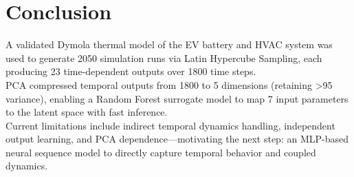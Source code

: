 \chapter{Conclusion}
A validated Dymola thermal model of the EV battery and HVAC system was used to generate 2050 simulation runs via Latin Hypercube Sampling, each producing 23 time-dependent outputs over 1800 time steps.\\
PCA compressed temporal outputs from 1800 to 5 dimensions (retaining >95 variance), enabling a Random Forest surrogate model to map 7 input parameters to the latent space with fast inference.\\
Current limitations include indirect temporal dynamics handling, independent output learning, and PCA dependence—motivating the next step: an MLP-based neural sequence model to directly capture temporal behavior and coupled dynamics.
